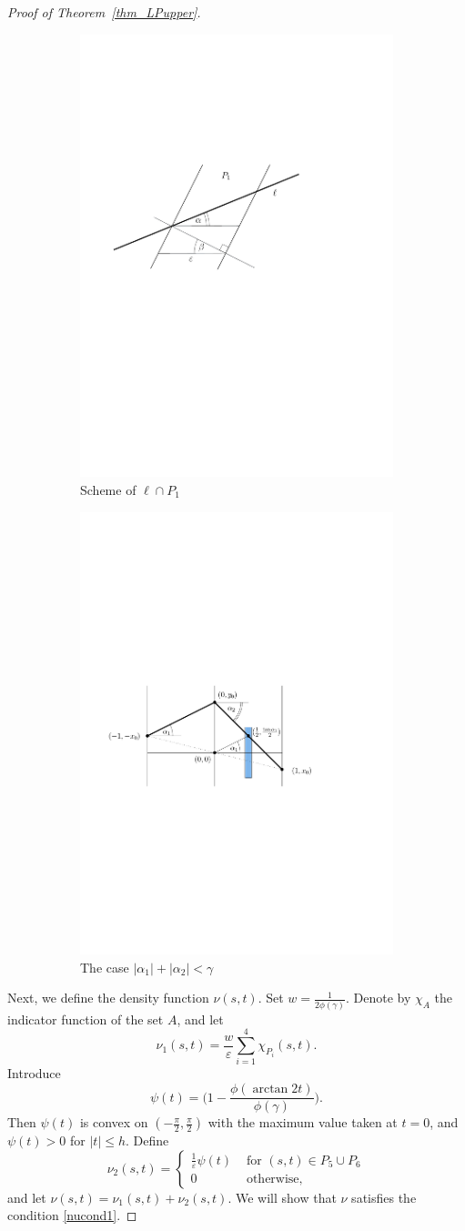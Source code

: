 \documentclass[11pt,a4paper]{amsart}
\newcommand{\eps}{\varepsilon}
\begin{document}
\begin{proof}[Proof of Theorem~\ref{thm_LPupper}]
\begin{figure}
\centering
\begin{subfigure}{.5\textwidth}
  \centering
  \includegraphics[height=.5\linewidth]{Figures/chess7a.pdf}
  \caption{Scheme of $\ell \cap P_1$}
  \label{fig7a}
\end{subfigure}%
\begin{subfigure}{.5\textwidth}
  \centering
  \includegraphics[height=.5\linewidth]{Figures/chess7b.pdf}
  \caption{The case $|\alpha_1| + |\alpha_2| < \gamma$}
  \label{fig7b}
\end{subfigure}
\caption{}
\label{fig7}
\end{figure}

Next, we define the density function $\nu (s,t)$. Set $w = \frac 1 {2 \phi (\gamma)}$.
Denote by $\chi_A$ the indicator function of the set $A$, and let
\[
\nu_1 (s,t)= \frac {w} { \eps} \sum_{i=1}^4 \chi_{P_i}(s,t).
\]
Introduce
\[
\psi(t) =  \Big( 1 - \frac{ \phi(\arctan 2 t)}{\phi(\gamma)}\Big).
\]
Then $\psi(t)$ is convex on $(-\frac \pi 2, \frac \pi 2)$ with the maximum value taken at $t = 0$, and $\psi(t) >0$ for $|t| \leq h$. Define
\begin{equation*}
\nu_2 (s,t) =
\begin{cases}
 \frac 1 {\eps} \psi(t) &\textrm{ for }(s,t) \in P_5 \cup P_6 \\
 0 &\textrm{ otherwise,}
\end{cases}
\end{equation*}
and let $\nu(s,t) = \nu_1(s,t) + \nu_2(s,t)$. We will show that $\nu$ satisfies the condition \eqref{nucond1}.




\end{proof}
\end{document}
